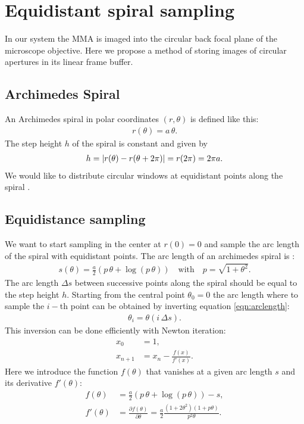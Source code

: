 \renewcommand{\(}{\left(}
\renewcommand{\)}{\right)}
\chapter{Equidistant spiral sampling}
\begin{summary}
  In our system the MMA is imaged into the circular back focal plane
  of the microscope objective. Here we propose a method of storing
  images of circular apertures in its linear frame buffer.
\end{summary}
\section{Archimedes Spiral}
An Archimedes spiral in polar coordinates $(r,\theta)$ is defined like
this:
\begin{align} \label{eqn:def}
  r(\theta)=a\,\theta.
\end{align}
The step height $h$ of the spiral is constant and given by
\begin{align}
  h=\mathopen| r(\theta)-r(\theta+2\pi) \mathclose|=r(2\pi)=2\pi a.
\end{align}
We would like to distribute circular windows at equidistant points
along the spiral \citep{Ahn1983}.
\section{Equidistance sampling}
We want to start sampling in the center at $r(0)=0$ and sample the arc
length of the spiral with equidistant points. The arc length of an
archimedes spiral is \citep{Weisstein}:
\begin{align} \label{eqn:arclength}
  s(\theta)=\frac{a}{2}\(p\,\theta + \log(p\,\theta)\)\quad\textrm{with}\quad
  p=\sqrt{1+\theta^2}.
\end{align}
The arc length $\Delta s$ between successive points along the spiral
should be equal to the step height $h$. Starting from the central
point $\theta_0=0$ the arc length where to sample the $i-$th point can
be obtained by inverting equation \eqref{eqn:arclength}:
\begin{align}
  \theta_i=\theta(i\,\Delta s).
\end{align}
This inversion can be done efficiently with Newton iteration:
\begin{align}
  x_0&=1,\\
  x_{n+1}&=x_n-\frac{f(x)}{f'(x)}.
\end{align}
Here we introduce the function $f(\theta)$ that vanishes at a given arc
length $s$ and its derivative $f'(\theta)$:
\begin{align}
  \label{eqn:f}
  f(\theta)&=\frac{a}{2}\(p\,\theta+\log(p\,\theta)\)-s,\\
  f'(\theta)&=\frac{\partial f(\theta)}{\partial \theta}=
  \frac{a}{2}\frac{(1+2\theta^2)(1+p\theta)}{p^2 \theta}.
\end{align}
